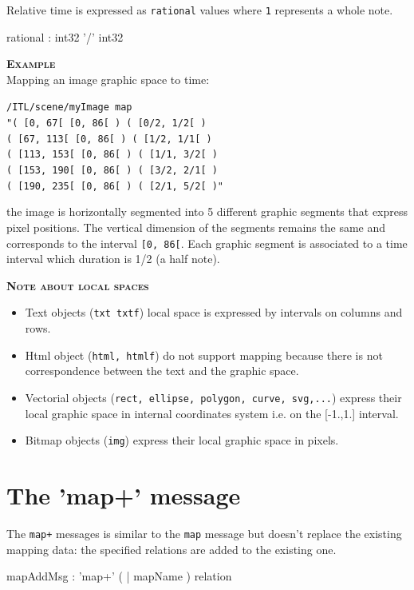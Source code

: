 \documentclass[a4paper,twoside]{report}
\newcommand{\sublevel}[1]	{\section{#1}}
\newcommand{\OSC}[1]		{\texttt{#1}}
\newcommand{\values}[1]	{\texttt{#1}}
\newcommand{\example}		{\textbf{\hspace{-1.5cm}\textbf{\textsc{Example }}}}
\newcommand{\note}	[1]		{\vspace{2mm}\textbf{\hspace{-1.03cm}\textbf{\textsc{Note #1}}}}
\newcommand{\sample}	[1]			{\vspace{-2mm}\begin{center}\colorbox{mygrey}{
								\begin{minipage}[t]{0.9\columnwidth} 
								{\small \texttt{#1}}
								\end{minipage}}\end{center}}
\begin{document}
Relative time is expressed as \OSC{rational} values where \values{1} represents a whole note.

\begin{rail}
rational : int32 '/' int32
\end{rail}

\example \\
Mapping an image graphic space to time:
\sample{/ITL/scene/myImage map \\
\hspace*{1cm}"( [0, 67[    [0, 86[ ) ( [0/2, 1/2[ ) \\
\hspace*{1.15cm}( [67, 113[  [0, 86[ ) ( [1/2, 1/1[ ) \\
\hspace*{1.15cm}( [113, 153[ [0, 86[ ) ( [1/1, 3/2[ ) \\
\hspace*{1.15cm}( [153, 190[ [0, 86[ ) ( [3/2, 2/1[ ) \\
\hspace*{1.15cm}( [190, 235[ [0, 86[ ) ( [2/1, 5/2[ )"
}
the image is horizontally segmented into 5 different graphic segments that express pixel positions. The vertical dimension of the segments remains the same and corresponds to the interval \values{[0, 86[}. Each graphic segment is associated to a time interval which duration is 1/2 (a half note).

\note{about local spaces}
\begin{itemize}
\item Text objects (\OSC{txt txtf}) local space is expressed by intervals on columns and rows.
\item Html object (\OSC{html, htmlf}) do not support mapping because there is not correspondence between the text and the graphic space.
\item Vectorial objects (\OSC{rect, ellipse, polygon, curve, svg,...}) express their local graphic space in internal coordinates system i.e. on the [-1.,1.] interval.
\item Bitmap objects (\OSC{img}) express their local graphic space in pixels.
\end{itemize}


\sublevel{The 'map+' message}
\label{mapAddMsg}
The \OSC{map+} messages is similar to the \OSC{map} message but doesn't replace the existing mapping data: the specified relations are added to the existing one.

\begin{rail}
mapAddMsg : 'map+' ( | mapName ) relation
\end{rail}
\end{document}
